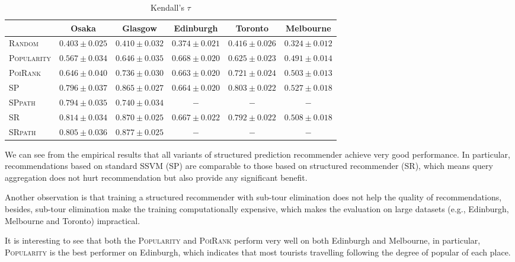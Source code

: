 \begin{table*}[t]
\caption{Kendall's $\tau$}
\label{tab:tau}
\centering
\begin{tabular}{l|ccccc} \hline
 & Osaka & Glasgow & Edinburgh & Toronto & Melbourne \\ \hline
\textsc{Random} & $0.403\pm0.025$ & $0.410\pm0.032$ & $0.374\pm0.021$ & $0.416\pm0.026$ & $0.324\pm0.012$ \\
\textsc{Popularity} & $0.567\pm0.034$ & $0.646\pm0.035$ & $\mathbf{0.668\pm0.020}$ & $0.625\pm0.023$ & $0.491\pm0.014$ \\
\textsc{PoiRank} & $0.646\pm0.040$ & $0.736\pm0.030$ & $0.663\pm0.020$ & $0.721\pm0.024$ & $0.503\pm0.013$ \\
\textsc{SP} & $0.796\pm0.037$ & $0.865\pm0.027$ & $0.664\pm0.020$ & $\mathbf{0.803\pm0.022}$ & $\mathbf{0.527\pm0.018}$ \\
\textsc{SPpath} & $0.794\pm0.035$ & $0.740\pm0.034$ & $-$ & $-$ & $-$ \\
\textsc{SR} & $\mathbf{0.814\pm0.034}$ & $\mathit{0.870\pm0.025}$ & $\mathit{0.667\pm0.022}$ & $\mathit{0.792\pm0.022}$ & $\mathit{0.508\pm0.018}$ \\
\textsc{SRpath} & $\mathit{0.805\pm0.036}$ & $\mathbf{0.877\pm0.025}$ & $-$ & $-$ & $-$ \\
\hline
\end{tabular}
\end{table*}

We can see from the empirical results that all variants of structured prediction recommender achieve very good performance.
In particular, recommendations based on standard SSVM (\textsc{SP}) are comparable to those based on structured recommender (\textsc{SR}), 
which means query aggregation does not hurt recommendation but also provide any significant benefit.

Another observation is that training a structured recommender with sub-tour elimination does not help the quality of recommendations,
besides, sub-tour elimination make the training computationally expensive, which makes the evaluation on large datasets 
(e.g., Edinburgh, Melbourne and Toronto) impractical.

It is interesting to see that both the \textsc{Popularity} and \textsc{PoiRank} perform very well on both Edinburgh and Melbourne,
in particular, \textsc{Popularity} is the best performer on Edinburgh, which indicates that most tourists travelling following the degree 
of popular of each place.
